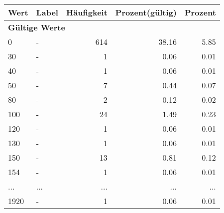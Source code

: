      \begin{longtable}{lXrrr}
     \toprule
     \textbf{Wert} & \textbf{Label} & \textbf{Häufigkeit} & \textbf{Prozent(gültig)} & \textbf{Prozent} \\
     \endhead
     \midrule
     \multicolumn{5}{l}{\textbf{Gültige Werte}}\\
        0 & \multicolumn{1}{X}{-} & %
          \num{614} &
          \num[round-mode=places,round-precision=2]{38,16} &
          \num[round-mode=places,round-precision=2]{5,85} \\
        30 & \multicolumn{1}{X}{-} & %
          \num{1} &
          \num[round-mode=places,round-precision=2]{0,06} &
          \num[round-mode=places,round-precision=2]{0,01} \\
        40 & \multicolumn{1}{X}{-} & %
          \num{1} &
          \num[round-mode=places,round-precision=2]{0,06} &
          \num[round-mode=places,round-precision=2]{0,01} \\
        50 & \multicolumn{1}{X}{-} & %
          \num{7} &
          \num[round-mode=places,round-precision=2]{0,44} &
          \num[round-mode=places,round-precision=2]{0,07} \\
        80 & \multicolumn{1}{X}{-} & %
          \num{2} &
          \num[round-mode=places,round-precision=2]{0,12} &
          \num[round-mode=places,round-precision=2]{0,02} \\
        100 & \multicolumn{1}{X}{-} & %
          \num{24} &
          \num[round-mode=places,round-precision=2]{1,49} &
          \num[round-mode=places,round-precision=2]{0,23} \\
        120 & \multicolumn{1}{X}{-} & %
          \num{1} &
          \num[round-mode=places,round-precision=2]{0,06} &
          \num[round-mode=places,round-precision=2]{0,01} \\
        130 & \multicolumn{1}{X}{-} & %
          \num{1} &
          \num[round-mode=places,round-precision=2]{0,06} &
          \num[round-mode=places,round-precision=2]{0,01} \\
        150 & \multicolumn{1}{X}{-} & %
          \num{13} &
          \num[round-mode=places,round-precision=2]{0,81} &
          \num[round-mode=places,round-precision=2]{0,12} \\
        154 & \multicolumn{1}{X}{-} & %
          \num{1} &
          \num[round-mode=places,round-precision=2]{0,06} &
          \num[round-mode=places,round-precision=2]{0,01} \\
       ... & ... & ... & ... & ... \\
        1920 & \multicolumn{1}{X}{-} & %
          \num{1} &
          \num[round-mode=places,round-precision=2]{0,06} &
          \num[round-mode=places,round-precision=2]{0,01} \\


\end{longtable}
